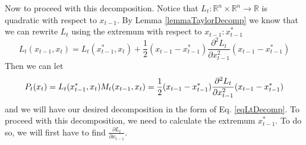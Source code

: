 Now to proceed with this decomposition. Notice that \(L_t : \mathbb{R}^n \times \mathbb{R}^n \to \mathbb{R}\) is quadratic with respect to \(x_{t-1}\). By Lemma \ref{lemmaTaylorDecomp} we know that we can rewrite \(L_t\) using the extremum with respect to \(x_{t-1}: x_{t-1}^*\)
\begin{equation} \label{eqLtDecompUsingLemma}
L_t(x_{t-1},x_t) = L_t(x_{t-1}^*,x_t) + \frac{1}{2} (x_{t-1} - x_{t-1}^*) \frac{\partial^2 L_t}{\partial x_{t-1}^2} (x_{t-1} - x_{t-1}^*)
\end{equation}
Then we can let \[
P_t(x_t) = L_t(x_{t-1}^*,x_t) \\ M_t(x_{t-1},x_t) = \frac{1}{2} (x_{t-1} - x_{t-1}^*) \frac{\partial^2 L_t}{\partial x_{t-1}^2} (x_{t-1} - x_{t-1}^*)
\]
and we will have our desired decomposition in the form of Eq. \ref{eqLtDecomp}. To proceed with this decomposition, we need to calculate the extremum \(x_{t-1}^*\). To do so, we will first have to find \(\frac{\partial L_t}{\partial x_{t-1}}\).


